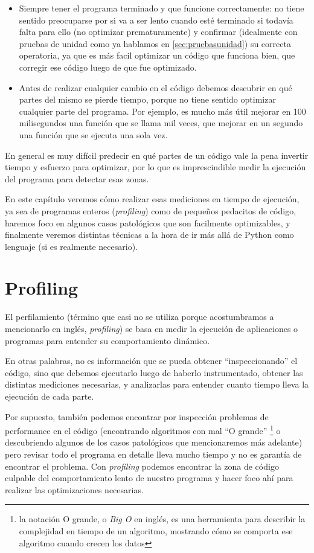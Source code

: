\begin{itemize}
    \item Siempre tener el programa terminado y que funcione correctamente: no tiene sentido preocuparse por si va a ser lento cuando esté terminado si todavía falta para ello (no optimizar prematuramente) y confirmar (idealmente con pruebas de unidad como ya hablamos en \ref{sec:pruebasunidad}) su correcta operatoria, ya que es más facil optimizar un código que funciona bien, que corregir ese código luego de que fue optimizado.
    \item  Antes de realizar cualquier cambio en el código debemos descubrir en qué partes del mismo se pierde tiempo, porque no tiene sentido optimizar cualquier parte del programa. Por ejemplo, es mucho más útil mejorar en 100 milisegundos una función que se llama mil veces, que mejorar en un segundo una función que se ejecuta una sola vez.
\end{itemize}

En general es muy difícil predecir en qué partes de un código vale la pena invertir tiempo y esfuerzo para optimizar, por lo que es imprescindible medir la ejecución del programa para detectar esas zonas.

En este capítulo veremos cómo realizar esas mediciones en tiempo de ejecución, ya sea de programas enteros (\textit{profiling}) como de pequeños pedacitos de código, haremos foco en algunos casos patológicos que son facilmente optimizables, y finalmente veremos distintas técnicas a la hora de ir más allá de Python como lenguaje (si es realmente necesario).


\section{Profiling}

El perfilamiento (término que casi no se utiliza porque acostumbramos a mencionarlo en inglés, \textit{profiling}) se basa en medir la ejecución de aplicaciones o programas para entender su comportamiento dinámico.

En otras palabras, no es información que se pueda obtener ``inspeccionando'' el código, sino que debemos ejecutarlo luego de haberlo instrumentado, obtener las distintas mediciones necesarias, y analizarlas para entender cuanto tiempo lleva la ejecución de cada parte.

Por supuesto, también podemos encontrar por inspección problemas de performance en el código (encontrando algoritmos con mal ``O grande'' \footnote{la notación O grande, o \textit{Big O} en inglés, es una herramienta para describir la complejidad en tiempo de un algoritmo, mostrando cómo se comporta ese algoritmo cuando crecen los datos} o descubriendo algunos de los casos patológicos que mencionaremos más adelante) pero revisar todo el programa en detalle lleva mucho tiempo y no es garantía de encontrar el problema. Con \textit{profiling} podemos encontrar la zona de código culpable del comportamiento lento de nuestro programa y hacer foco ahí para realizar las optimizaciones necesarias.

